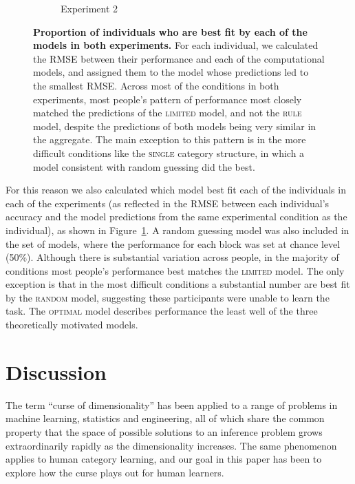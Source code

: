 \documentclass[a4paper, doc, floatsintext]{apa6}
\begin{document}
\begin{figure}
\begin{subfigure}[b]{0.45\textwidth}
      \caption{Experiment 2}
    \end{subfigure}
    \vspace{3mm}
    \caption{\small{\textbf{Proportion of individuals who are best fit by each of the models in both experiments.} For each individual, we calculated the RMSE between their performance and each of the computational models, and assigned them to the model whose predictions led to the smallest RMSE. Across most of the conditions in both experiments, most people's pattern of performance most closely matched the predictions of the \textsc{limited} model, and not the \textsc{rule} model, despite the predictions of both models being very similar in the aggregate. The main exception to this pattern is in the more difficult conditions like the \textsc{single} category structure, in which a model consistent with random guessing did the best.}}
    \label{individual-fits}
\end{figure}

For this reason we also calculated which model best fit each of the individuals in each of the experiments (as reflected in the RMSE between each individual's accuracy and the model predictions from the same experimental condition as the individual), as shown in Figure~\ref{individual-fits}. A random guessing model was also included in the set of models, where the performance for each block was set at chance level (50\%). Although there is substantial variation across people, in the majority of conditions most people's performance best matches the \textsc{limited} model. The only exception is that in the most difficult conditions a substantial number are best fit by the \textsc{random} model, suggesting these participants were unable to learn the task. The \textsc{optimal} model describes performance the least well of the three theoretically motivated models.

\section{Discussion}

The term ``curse of dimensionality'' has been applied to a range of problems in machine learning, statistics and engineering, all of which share the common property that the space of possible solutions to an inference problem grows extraordinarily rapidly as the dimensionality increases. The same phenomenon applies to human category learning, and our goal in this paper has been to explore how the curse plays out for human learners.
\end{document}
